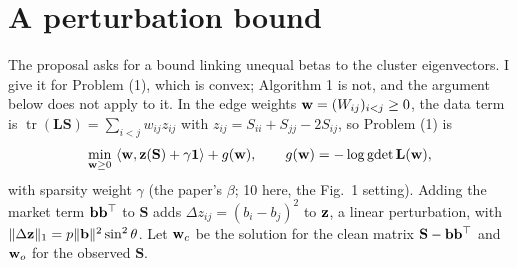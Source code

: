 \documentclass[11pt,a4paper]{article}
\newcommand{\Lap}{\mathbf{L}}
\newcommand{\Smat}{\mathbf{S}}
\newcommand{\one}{\mathbf{1}}
\newcommand{\tr}{\operatorname{tr}}
\theoremstyle{remark}
\begin{document}
\section{A perturbation bound}\label{sec:bound}

The proposal asks for a bound linking unequal betas to the cluster eigenvectors. I give
it for Problem (1), which is convex; Algorithm 1 is not, and the argument below does not
apply to it. In the edge weights $\mathbf w=(W_{ij})_{i<j}\ge0$, the data term is
$\tr(\Lap\Smat)=\sum_{i<j}w_{ij}z_{ij}$ with $z_{ij}=S_{ii}+S_{jj}-2S_{ij}$, so Problem
(1) is
\[
  \min_{\wvec\ge0}\ \langle\wvec,\zvec(\Smat)+\gamma\one\rangle+g(\wvec),\qquad
  g(\wvec)=-\log\operatorname{gdet}\Lap(\wvec),
\]
with sparsity weight $\gamma$ (the paper's $\beta$; 10 here, the Fig.~1 setting). Adding
the market term $\mathbf b\mathbf b^\top$ to $\Smat$ adds $\Delta z_{ij}=(b_i-b_j)^2$ to
$\mathbf z$, a linear perturbation, with $\lVert\Delta\mathbf z\rVert_1=p\lVert\mathbf b\rVert^2
\sin^2\theta$. Let $\mathbf w_c$ be the solution for the clean matrix
$\Smat-\bvec\bvec^\top$ and $\mathbf w_o$ for the observed $\Smat$.
\end{document}
